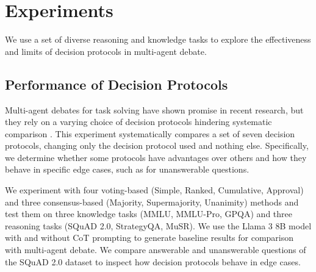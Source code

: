 \section{Experiments}
We use a set of diverse reasoning and knowledge tasks to explore the effectiveness and limits of decision protocols in multi-agent debate.


\subsection{Performance of Decision Protocols}
\label{sec:experiment1}

Multi-agent debates for task solving have shown promise in recent research, but they rely on a varying choice of decision protocols hindering systematic comparison \citep{yin_exchange--thought_2023, chen_reconcile_2024}. 
This experiment systematically compares a set of seven decision protocols, changing only the decision protocol used and nothing else.
Specifically, we determine whether some protocols have advantages over others and how they behave in specific edge cases, such as for unanswerable questions.

We experiment with four voting-based (Simple, Ranked, Cumulative, Approval) and three consensus-based (Majority, Supermajority, Unanimity) methods and test them on three knowledge tasks (MMLU, MMLU-Pro, GPQA) and three reasoning tasks (SQuAD 2.0, StrategyQA, MuSR).
We use the Llama 3 8B model with and without \ac{CoT} prompting to generate baseline results for comparison with multi-agent debate.
We compare answerable and unanswerable questions of the SQuAD 2.0 dataset to inspect how decision protocols behave in edge cases.

